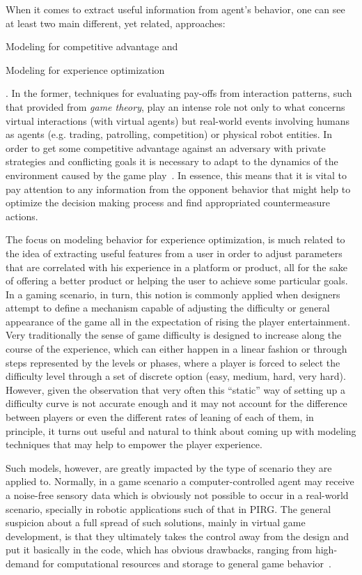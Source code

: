 When it comes to extract useful information from agent's behavior, one can see at least two main different, yet related, approaches: \begin{inparaenum}\item Modeling for competitive advantage and \item Modeling for experience optimization\end{inparaenum}. In the former, techniques for evaluating pay-offs from interaction patterns, such that provided from \textit{game theory}, play an intense role not only to what concerns virtual interactions (with virtual agents) but real-world events involving humans as agents (e.g. trading, patrolling, competition) or physical robot entities. In order to get some competitive advantage against an adversary with private strategies and conflicting goals it is necessary to adapt to the dynamics of the environment caused by the game play~\cite{OppRobocup}. In essence, this means that it is vital to pay attention to any information from the opponent behavior that might help to optimize the decision making process and find appropriated countermeasure actions.

The focus on modeling behavior for experience optimization, is much related to the idea of extracting useful features from a user in order to adjust parameters that are correlated with his experience in a platform or product, all for the sake of offering a better product or helping the user to achieve some particular goals. In a gaming scenario, in turn, this notion is commonly applied when designers attempt to define a mechanism capable of adjusting the difficulty or general appearance of the game all in the expectation of rising the player entertainment. Very traditionally the sense of game difficulty is designed to increase along the course of the experience, which can either happen in a linear fashion or through steps represented by the levels or phases, where a player is forced to select the difficulty level through a set of discrete option (easy, medium, hard, very hard). However, given the observation that very often this ``static'' way of setting up a difficulty curve is not accurate enough and it may not account for the difference between players or even the different rates of leaning of each of them, in principle, it turns out useful and natural to think about coming up with modeling techniques that may help to empower the player experience. 

Such models, however, are greatly impacted by the type of scenario they are applied to. Normally, in a game scenario a computer-controlled agent may receive a noise-free sensory data which is obviously not possible to occur in a real-world scenario, specially in robotic applications such of that in PIRG. The general suspicion about a full spread of such solutions, mainly in virtual game development, is that they ultimately takes the control away from the design and put it basically in the code, which has obvious drawbacks, ranging from high-demand for computational resources and storage to general game behavior~\cite{hunicke2004ai}. 

